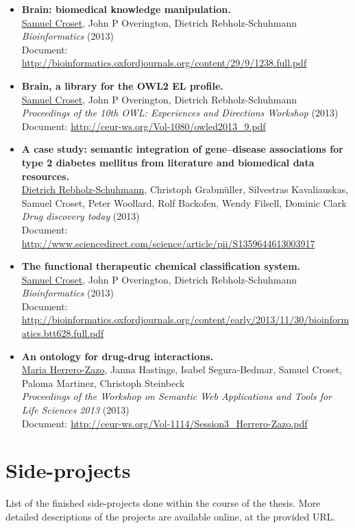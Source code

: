 \begin{itemize}
  \item \textbf{Brain: biomedical knowledge manipulation.} \\ \underline{Samuel Croset}, John P Overington, Dietrich Rebholz-Schuhmann \\ \emph{Bioinformatics} (2013) \\ Document: \url{http://bioinformatics.oxfordjournals.org/content/29/9/1238.full.pdf}
  \item \textbf{Brain, a library for the OWL2 EL profile.} \\ \underline{Samuel Croset}, John P Overington, Dietrich Rebholz-Schuhmann \\ \emph{Proceedings of the 10th OWL: Experiences and Directions Workshop} (2013) \\ Document: \url{http://ceur-ws.org/Vol-1080/owled2013_9.pdf}
  \item \textbf{A case study: semantic integration of gene–disease associations for type 2 diabetes mellitus from literature and biomedical data resources.} \\ \underline{Dietrich Rebholz-Schuhmann}, Christoph Grabmüller, Silvestras Kavaliauskas, Samuel Croset, Peter Woollard, Rolf Backofen, Wendy Filsell, Dominic Clark \\ \emph{Drug discovery today} (2013) \\ Document: \url{http://www.sciencedirect.com/science/article/pii/S1359644613003917}
  \item \textbf{The functional therapeutic chemical classification system.} \\ \underline{Samuel Croset}, John P Overington, Dietrich Rebholz-Schuhmann \\ \emph{Bioinformatics} (2013) \\ Document: \url{http://bioinformatics.oxfordjournals.org/content/early/2013/11/30/bioinformatics.btt628.full.pdf}
  \item \textbf{An ontology for drug-drug interactions.} \\ \underline{Maria Herrero-Zazo}, Janna Hastings, Isabel Segura-Bedmar, Samuel Croset, Paloma Martinez, Christoph Steinbeck \\ \emph{Proceedings of the Workshop on Semantic Web Applications and Tools for Life Sciences 2013} (2013) \\ Document: \url{http://ceur-ws.org/Vol-1114/Session3_Herrero-Zazo.pdf}
\end{itemize}

\chapter{Side-projects}
List of the finished side-projects done within the course of the thesis. More detailed descriptions of the projects are available online, at the provided URL.



